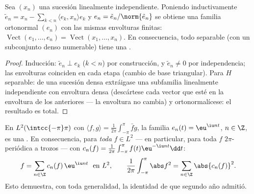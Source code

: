 \begin{proposition}\label{prop:b3:hilbert:gramschmidt}
Sea $(x_n)$ una sucesión linealmente independiente. Poniendo
inductivamente $\tilde e_n = x_n - \sum_{k<n}\langle e_k,
x_n\rangle e_k$ y $e_n = \tilde e_n/\norm{\tilde e_n}$ se obtiene una
familia ortonormal $(e_n)$ con las mismas envolturas finitas:
$\operatorname{Vect}(e_1, \dots, e_n) = \operatorname{Vect}
(x_1, \dots, x_n)$. En consecuencia, todo
 separable (con un
subconjunto denso numerable) tiene una .
\end{proposition}

\begin{proof}
Inducción: $\tilde e_n \perp e_k$ ($k < n$) por construcción, y
$\tilde e_n \neq 0$ por independencia; las envolturas coinciden en cada
etapa (cambio de base triangular). Para $H$ separable: de una sucesión
densa extráigase una subfamilia linealmente independiente con envoltura
densa (descártese cada vector que esté en la envoltura de los anteriores
--- la envoltura no cambia) y ortonormalícese: el resultado es total.
\end{proof}

\begin{theorem}
\label{thm:b3:hilbert:fourier}
En $L^2(\intcc{-\pi}\pi)$ con $\langle f, g\rangle =
\frac1{2\pi}\int_{-\pi}^\pi \bar fg$, la familia $e_n(t) =
\eu^{\iu nt}$, $n \in \Z$, es una . En consecuencia, para \emph{toda} $f \in L^2$ --- en
particular, para toda $f$ $2\pi$-periódica
 a trozos --- con $c_n(f) =
\frac1{2\pi}\int_{-\pi}^{\pi}f(t)\eu^{-\iu nt}\dd t$:
\[
f = \sum_{n\in\Z}c_n(f)\,\eu^{\iu nt} \ \ \text{en } L^2,
\qquad
\frac1{2\pi}\int_{-\pi}^{\pi}\abs f^2 =
\sum_{n\in\Z}\abs{c_n(f)}^2 .
\]
Esto demuestra, con toda generalidad, la identidad de
 que segundo año
admitió.
\end{theorem}


